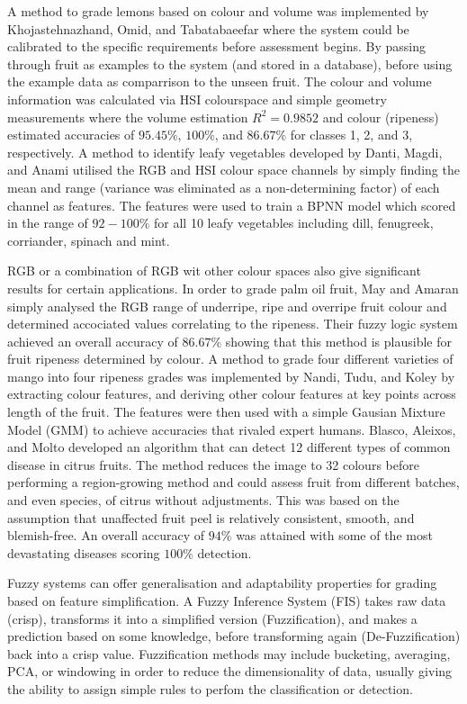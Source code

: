\documentclass[fleqn,twoside]{article}
\begin{document}
A method to grade lemons based on colour and volume was implemented by Khojastehnazhand, Omid, and Tabatabaeefar \cite{khojastehnazhand} where the system could be calibrated to the specific requirements before assessment begins. By passing through fruit as examples to the system (and stored in a database), before using the example data as comparrison to the unseen fruit. The colour and volume information was calculated via HSI colourspace and simple geometry measurements where the volume estimation $R^2 = 0.9852$ and colour (ripeness) estimated accuracies of $95.45\%$, $100\%$, and $86.67\%$ for classes 1, 2, and 3, respectively.
A method to identify leafy vegetables developed by Danti, Magdi, and Anami \cite{danti} utilised the RGB and HSI colour space channels by simply finding the mean and range (variance was eliminated as a non-determining factor) of each channel as features. The features were used to train a BPNN model which scored in the range of $92-100\%$ for all 10 leafy vegetables including dill, fenugreek, corriander, spinach and mint. 

RGB or a combination of RGB wit other colour spaces also give significant results for certain applications. In order to grade palm oil fruit, May and Amaran \cite{may} simply analysed the RGB range of underripe, ripe and overripe fruit colour and determined accociated values correlating to the ripeness. Their fuzzy logic system achieved an overall accuracy of $86.67\%$ showing that this method is plausible for fruit ripeness determined by colour. A method to grade four different varieties of mango into four ripeness grades was implemented by Nandi, Tudu, and Koley \cite{nandi} by extracting colour features, and deriving other colour features at key points across length of the fruit. The features were then used with a simple Gausian Mixture Model (GMM) to achieve accuracies that rivaled expert humans. Blasco, Aleixos, and Molto \cite{blasco2} developed an algorithm that can detect 12 different types of common disease in citrus fruits. The method reduces the image to 32 colours before performing a region-growing method and could assess fruit from different batches, and even species, of citrus without adjustments. This was based on the assumption that unaffected fruit peel is relatively consistent, smooth, and blemish-free. An overall accuracy of $94\%$ was attained with some of the most devastating diseases scoring $100\%$ detection. 

Fuzzy systems can offer generalisation and adaptability properties for grading based on feature simplification. A Fuzzy Inference System (FIS) takes raw data (crisp), transforms it into a simplified version (Fuzzification), and makes a prediction based on some knowledge, before transforming again (De-Fuzzification) back into a crisp value. Fuzzification methods may include bucketing, averaging, PCA, or windowing in order to reduce the dimensionality of data, usually giving the ability to assign simple rules to perfom the classification or detection.
\end{document}
